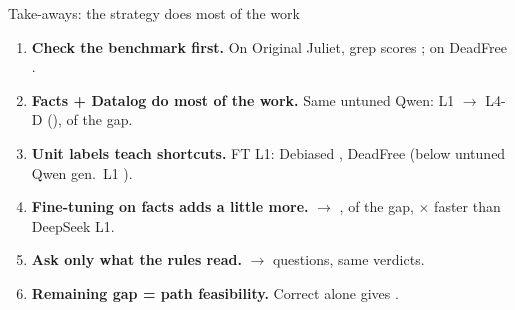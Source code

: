 \begin{frame}{Take-aways: the strategy does most of the work}
  \begin{enumerate}
    \item \textbf{Check the benchmark first.} On Original Juliet, grep scores ; on DeadFree .
    \item \textbf{Facts + Datalog do most of the work.} Same untuned Qwen: L1  $\to$ L4-D  (),  of the gap.
    \item \textbf{Unit labels teach shortcuts.} FT L1: Debiased , DeadFree  (below untuned Qwen gen.\ L1 ).
    \item \textbf{Fine-tuning on facts adds a little more.}  $\to$ ,  of the gap, $\times$ faster than DeepSeek L1.
    \item \textbf{Ask only what the rules read.}  $\to$  questions, same verdicts.
    \item \textbf{Remaining gap = path feasibility.} Correct  alone gives .
  \end{enumerate}
\end{frame}

